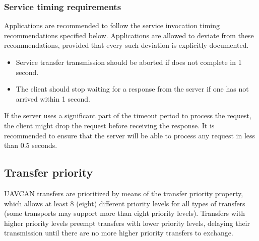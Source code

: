 \subsubsection{Service timing requirements}

Applications are recommended to follow the service invocation timing recommendations specified below.
Applications are allowed to deviate from these recommendations,
provided that every such deviation is explicitly documented.

\begin{itemize}
    \item Service transfer transmission should be aborted if does not complete in 1 second.
    \item The client should stop waiting for a response from the server if one has not arrived within 1 second.
\end{itemize}

If the server uses a significant part of the timeout period to process the request,
the client might drop the request before receiving the response.
It is recommended to ensure that the server will be able to process any request in less than 0.5 seconds.

\subsection{Transfer priority}\label{sec:transfer_prioritization}

UAVCAN transfers are prioritized by means of the transfer priority property,
which allows at least 8 (eight) different priority levels for all types of transfers
(some transports may support more than eight priority levels).
Transfers with higher priority levels preempt transfers with lower priority levels,
delaying their transmission until there are no more higher priority transfers to exchange.


